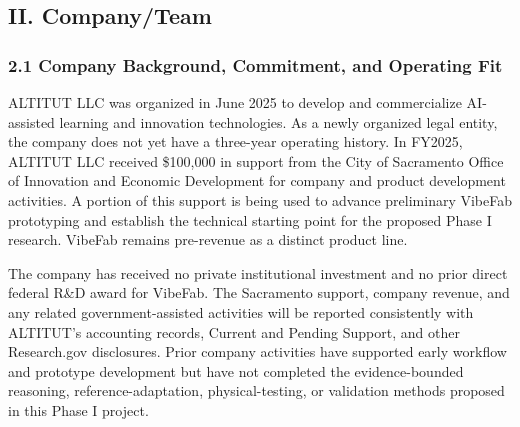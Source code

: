 \documentclass[11pt,letterpaper]{article}
\begin{document}
\subsection*{II. Company/Team}

\subsubsection*{2.1 Company Background, Commitment, and Operating Fit}
ALTITUT LLC was organized in June 2025 to develop and commercialize AI-assisted learning and innovation technologies. As a newly organized legal entity, the company does not yet have a three-year operating history. In FY2025, ALTITUT LLC received \$100,000 in support from the City of Sacramento Office of Innovation and Economic Development for company and product development activities. A portion of this support is being used to advance preliminary VibeFab prototyping and establish the technical starting point for the proposed Phase I research. VibeFab remains pre-revenue as a distinct product line.

The company has received no private institutional investment and no prior direct federal R\&D award for VibeFab. The Sacramento support, company revenue, and any related government-assisted activities will be reported consistently with ALTITUT's accounting records, Current and Pending Support, and other Research.gov disclosures. Prior company activities have supported early workflow and prototype development but have not completed the evidence-bounded reasoning, reference-adaptation, physical-testing, or validation methods proposed in this Phase I project.
\end{document}
